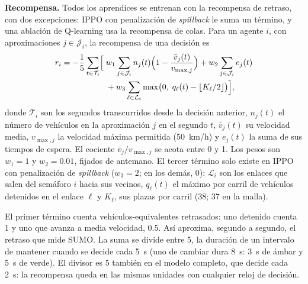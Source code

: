 \noindent\textbf{Recompensa.} Todos los aprendices se entrenan con la
recompensa de retraso, con dos excepciones: IPPO con penalización de
\textit{spillback} le suma un término, y una ablación de Q-learning usa
la recompensa de colas. Para un agente $i$, con aproximaciones
$j \in \mathcal{J}_i$, la recompensa de una decisión es
\begin{equation}
  \begin{aligned}
  r_i = -\frac{1}{5}\sum_{t \in \mathcal{T}_i} \Bigl[\;
        & w_1 \sum_{j \in \mathcal{J}_i} n_j(t)\Bigl(1 - \frac{\bar v_j(t)}{v_{\max,j}}\Bigr)
        + w_2 \sum_{j \in \mathcal{J}_i} e_j(t) \\
        & + w_3 \sum_{\ell \in \mathcal{L}_i} \max\bigl(0,\; q_\ell(t) - \lfloor K_\ell/2 \rfloor\bigr) \Bigr],
  \end{aligned}
  \label{eq:recompensa-u4}
\end{equation}
donde $\mathcal{T}_i$ son los segundos transcurridos desde la decisión
anterior, $n_j(t)$ el número de vehículos en la aproximación $j$ en el
segundo $t$, $\bar v_j(t)$ su velocidad media, $v_{\max,j}$ la
velocidad máxima permitida (50~km/h) y $e_j(t)$ la suma de sus tiempos
de espera. El cociente $\bar v_j / v_{\max,j}$ se acota entre 0 y 1.
Los pesos son $w_1 = 1$ y $w_2 = 0.01$, fijados de antemano. El tercer
término solo existe en IPPO con penalización de \textit{spillback}
($w_3 = 2$; en los demás, 0): $\mathcal{L}_i$ son los enlaces que salen
del semáforo $i$ hacia sus vecinos, $q_\ell(t)$ el máximo por carril de
vehículos detenidos en el enlace $\ell$ y $K_\ell$, sus plazas por
carril (38; 37 en la malla).

El primer término cuenta vehículos-equivalentes retrasados: uno
detenido cuenta 1 y uno que avanza a media velocidad, 0.5. Así
aproxima, segundo a segundo, el retraso que mide SUMO. La suma se
divide entre 5, la duración de un intervalo de mantener cuando se
decide cada 5~s (uno de cambiar dura 8~s: 3~s de ámbar y 5~s de verde).
El divisor es 5 también en el modelo completo, que decide cada 2~s: la
recompensa queda en las mismas unidades con cualquier reloj de
decisión.

